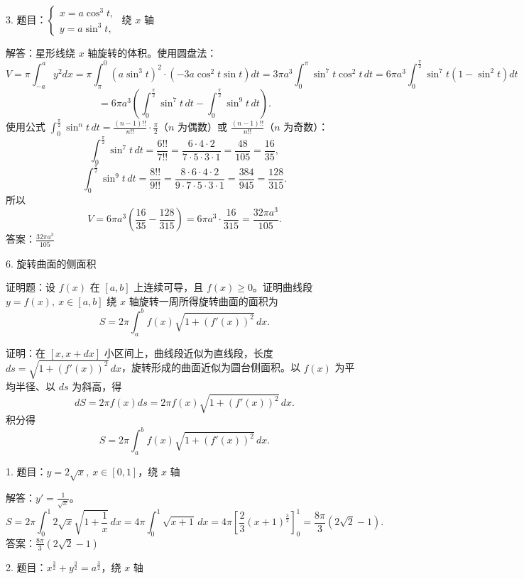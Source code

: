 3. 题目：\(\begin{cases}x=a\cos^{3}t,\\ y=a\sin^{3}t,\end{cases}\) 绕 \(x\) 轴

解答：星形线绕 \(x\) 轴旋转的体积。使用圆盘法：
\[ V=\pi\int_{-a}^{a}y^{2}dx=\pi\int_{\pi}^{0}(a\sin^{3}t)^{2}\cdot(-3a\cos^{2}t\sin t)dt=3\pi a^{3}\int_{0}^{\pi}\sin^{7}t\cos^{2}t\,dt=6\pi a^{3}\int_{0}^{\frac{\pi}{2}}\sin^{7}t(1-\sin^{2}t)dt \]
\[ =6\pi a^{3}\left(\int_{0}^{\frac{\pi}{2}}\sin^{7}t\,dt-\int_{0}^{\frac{\pi}{2}}\sin^{9}t\,dt\right). \]
使用公式 \(\int_{0}^{\frac{\pi}{2}}\sin^{n}t\,dt=\frac{(n-1)!!}{n!!}\cdot\frac{\pi}{2}\)（\(n\) 为偶数）或 \(\frac{(n-1)!!}{n!!}\)（\(n\) 为奇数）：
\[ \int_{0}^{\frac{\pi}{2}}\sin^{7}t\,dt=\frac{6!!}{7!!}=\frac{6\cdot4\cdot2}{7\cdot5\cdot3\cdot1}=\frac{48}{105}=\frac{16}{35}, \]
\[ \int_{0}^{\frac{\pi}{2}}\sin^{9}t\,dt=\frac{8!!}{9!!}=\frac{8\cdot6\cdot4\cdot2}{9\cdot7\cdot5\cdot3\cdot1}=\frac{384}{945}=\frac{128}{315}. \]
所以
\[ V=6\pi a^{3}\left(\frac{16}{35}-\frac{128}{315}\right)=6\pi a^{3}\cdot\frac{16}{315}=\frac{32\pi a^{3}}{105}. \]
答案：\(\frac{32\pi a^{3}}{105}\)

6. 旋转曲面的侧面积

证明题：设 \(f(x)\) 在 \([a,b]\) 上连续可导，且 \(f(x)\ge0\)。证明曲线段 \(y=f(x),\ x\in[a,b]\) 绕 \(x\) 轴旋转一周所得旋转曲面的面积为
\[ S=2\pi\int_{a}^{b}f(x)\sqrt{1+(f'(x))^{2}}\,dx. \]

证明：在 \([x,x+dx]\) 小区间上，曲线段近似为直线段，长度 \(ds=\sqrt{1+(f'(x))^{2}}\,dx\)，旋转形成的曲面近似为圆台侧面积。以 \(f(x)\) 为平均半径、以 \(ds\) 为斜高，得
\[ dS=2\pi f(x)ds=2\pi f(x)\sqrt{1+(f'(x))^{2}}\,dx. \]
积分得
\[ S=2\pi\int_{a}^{b}f(x)\sqrt{1+(f'(x))^{2}}\,dx. \]

1. 题目：\(y=2\sqrt{x},\ x\in[0,1]\)，绕 \(x\) 轴

解答：\(y'=\frac{1}{\sqrt{x}}\)。
\[ S=2\pi\int_{0}^{1}2\sqrt{x}\sqrt{1+\frac{1}{x}}\,dx=4\pi\int_{0}^{1}\sqrt{x+1}\,dx=4\pi\left[\frac{2}{3}(x+1)^{\frac{3}{2}}\right]_{0}^{1}=\frac{8\pi}{3}\left(2\sqrt2-1\right). \]
答案：\(\frac{8\pi}{3}\left(2\sqrt2-1\right)\)

2. 题目：\(x^{\frac{3}{2}}+y^{\frac{3}{2}}=a^{\frac{3}{2}}\)，绕 \(x\) 轴

